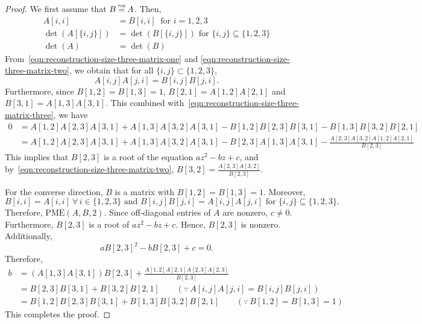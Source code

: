 \documentclass[10pt,a4paper]{amsart}
\newcommand{\PME}{\stackrel{\mathclap{\scalebox{.4}{\mbox{PME}}}}{=}}
\newcommand{\kPME}[3]{\mathrm{PME}(#1, #2, #3)}
\begin{document}
\begin{proof}
We first assume that $B\PME A$. Then, 
\begin{align}
A[i,i] &= B[i,i] \ \text{ for } i=1,2,3\label{eqn:reconstruction-size-three-matrix-one}\\
\det(A[\{i,j\}]) &= \det(B[\{i,j\}]) \text{ for } \{i, j\}\subseteq \{1,2,3\} \label{eqn:reconstruction-size-three-matrix-two}\\
\det(A) &=\det(B)\label{eqn:reconstruction-size-three-matrix-three}
\end{align}
From~\cref{eqn:reconstruction-size-three-matrix-one} and \cref{eqn:reconstruction-size-three-matrix-two}, we obtain that for all $\{i, j\}\subset\{1,2,3\}$, $$A[i,j]A[j,i]=B[i,j]B[j,i].$$
Furthermore, since $B[1,2]=B[1,3] = 1$, $B[2,1] = A[1,2]A[2,1]$ and $B[3,1]=A[1,3]A[3,1]$. This combined with~\cref{eqn:reconstruction-size-three-matrix-three}, we have 
\begin{align*}
0 &= A[1,2]A[2,3]A[3,1]+A[1,3]A[3,2]A[3,1]-B[1,2]B[2,3]B[3,1]-B[1,3]B[3,2]B[2,1]\\
&=A[1,2]A[2,3]A[3,1]+A[1,3]A[3,2]A[3,1]-B[2,3]A[1,3]A[3,1]-\frac{A[2,3]A[3,2]A[1,2]A[2,1]}{B[2,3]}
\end{align*}
This implies that $B[2,3]$ is a root of the equation $az^2-bz+c$, and by~\cref{eqn:reconstruction-size-three-matrix-two}, $B[3,2]=\frac{A[2,3]A[3,2]}{B[2,3]}$.

For the converse direction, $B$ is a matrix with $B[1,2]=B[1,3]=1$. Moreover, $$B[i,i]=A[i,i] \ \forall\,i\in\{1,2,3\} \text{ and } B[i,j]B[j,i]=A[i,j]A[j,i] \text{ for }\{i,j\}\subseteq \{1,2,3\}.$$ Therefore, $\kPME{A}{B}{2}$. Since off-diagonal entries of $A$ are nonzero, $c\neq 0$. Furthermore, $B[2,3]$ is a root of $az^2-bz+c$. Hence, $B[2,3]$ is nonzero. Additionally, $$aB[2,3]^2-bB[2,3]+c = 0.$$ Therefore,
\begin{align*}
b&=\left(A[1,3]A[3,1]\right)B[2,3]+\frac{A[1,2]A[2,1]A[2,3]A[2,3]}{B[2,3]}\\
&=B[2,3]B[3,1]+B[3,2]B[2,1] \qquad (\because\  A[i,j]A[j,i]=B[i,j]B[j,i])\\
&=B[1,2]B[2,3]B[3,1]+B[1,3]B[3,2]B[2,1] \qquad (\because\ B[1,2]=B[1,3]=1)
\end{align*}
This completes the proof.
\end{proof}
\end{document}
